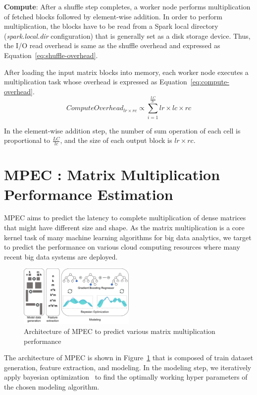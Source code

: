 \documentclass[10pt, conference, compsocconf]{IEEEtran}
\begin{document}
\textbf{Compute}: After a shuffle step completes, a worker node performs multiplication of fetched blocks followed by element-wise addition. In order to perform multiplication, the blocks have to be read from a Spark local directory (\textit{spark.local.dir} configuration) that is generally set as a disk storage device. Thus, the I/O read overhead is same as the shuffle overhead and expressed as Equation~\ref{eq:shuffle-overhead}.

After loading the input matrix blocks into memory, each worker node executes a multiplication task whose overhead is expressed as Equation~\ref{eq:compute-overhead}.
\begin{equation}\label{eq:compute-overhead}
  ComputeOverhead_{lr \times rc} \propto \sum\limits_{i=1}^{\frac{LC}{lc}} lr \times lc \times rc
\end{equation}

In the element-wise addition step, the number of sum operation of each cell is proportional to $\frac{LC}{lc}$, and the size of each output block is $lr \times rc$.

\section{MPEC : Matrix Multiplication Performance Estimation}\label{sec:mpc-structure}
MPEC aims to predict the latency to complete multiplication of dense matrices that might have different size and shape. As the matrix multiplication is a core kernel task of many machine learning algorithms for big data analytics, we target to predict the performance on various cloud computing resources where many recent big data systems are deployed.

\begin{figure}
  \centering\includegraphics[width=0.5\textwidth]{figures/mpc-architecture.pdf}\caption{Architecture of MPEC to predict various matrix multiplication performance}\label{fig:mpc-architecture}
\end{figure}

The architecture of MPEC is shown in Figure~\ref{fig:mpc-architecture} that is composed of train dataset generation, feature extraction, and modeling. In the modeling step, we iteratively apply bayesian optimization~\cite{bayesian-optimization} to find the optimally working hyper parameters of the chosen modeling algorithm.
\end{document}
